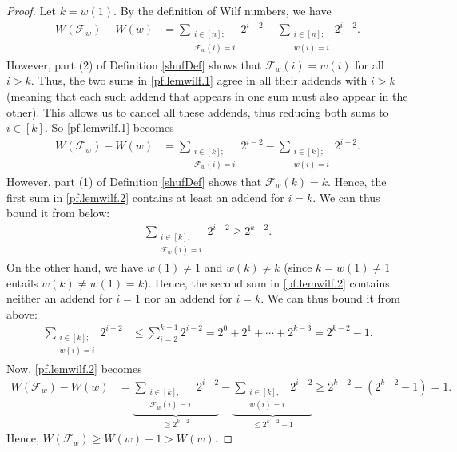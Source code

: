 \documentclass[final,nomarks]{dmtcs-episciences}
\theoremstyle{definition}
\theoremstyle{definition}
\theoremstyle{remark}
\newcommand{\f}{\mathcal{F}} %
\newcommand{\tup}[1]{\left( #1 \right)}
\begin{document}
\begin{proof}
    Let $k = w\tup{1}$.
    By the definition of Wilf numbers, we have
        \begin{align}
        W\tup{ \f_w } - W\tup{ w }
        &= \sum_{\substack{i \in [n];\\ \f_w\tup{ i }=i}} 2^{i-2} - \sum_{\substack{i \in [n];\\ w\tup{ i }=i}} 2^{i-2} .
        \label{pf.lemwilf.1}
        \end{align}
    However, part (2) of Definition \ref{shufDef} shows that $\f_w\tup{i} = w\tup{i}$ for all $i>k$.
    Thus, the two sums in \eqref{pf.lemwilf.1} agree in all their addends with $i > k$ (meaning that each such addend that appears in one sum must also appear in the other).
    This allows us to cancel all these addends, thus reducing both sums to $i \in [k]$.
    So \eqref{pf.lemwilf.1} becomes
        \begin{align}
        W\tup{ \f_w } - W\tup{ w }
        &= \sum_{\substack{i \in [k];\\ \f_w\tup{ i }=i}} 2^{i-2} - \sum_{\substack{i \in [k];\\ w\tup{ i }=i}} 2^{i-2} .
        \label{pf.lemwilf.2}
        \end{align}
    However, part (1) of Definition \ref{shufDef} shows that $\f_w\tup{k} = k$. Hence, the first sum in \eqref{pf.lemwilf.2} contains at least an addend for $i = k$. We can thus bound it from below:
    \begin{align*}
        \sum_{\substack{i \in [k];\\ \f_w\tup{ i }=i}} 2^{i-2} \ge 2^{k-2}.
    \end{align*}
    On the other hand, we have $w\tup{1} \neq 1$ and $w\tup{k} \neq k$ (since $k = w\tup{1} \neq 1$ entails $w\tup{k} \neq w\tup{1} = k$).
    Hence, the second sum in \eqref{pf.lemwilf.2} contains neither an addend for $i = 1$ nor an addend for $i = k$.
    We can thus bound it from above:
    \begin{align*}
        \sum_{\substack{i \in [k];\\ w\tup{ i }=i}} 2^{i-2}
        &\le \sum_{i=2}^{k-1} 2^{i-2}
        = 2^0 + 2^1 + \cdots + 2^{k-3}
        = 2^{k-2} - 1.
    \end{align*}
    Now, \eqref{pf.lemwilf.2} becomes
        \begin{align*}
        W\tup{ \f_w } - W\tup{ w }
        &= \underbrace{\sum_{\substack{i \in [k];\\ \f_w\tup{ i }=i}} 2^{i-2}}_{\ge 2^{k-2}} - \underbrace{\sum_{\substack{i \in [k];\\ w\tup{ i }=i}} 2^{i-2}}_{\le 2^{k-2} - 1}
        \ge 2^{k-2} - \tup{2^{k-2} - 1} = 1.
        \end{align*}
    Hence, $W\tup{ \f_w } \geq W\tup{ w } + 1 > W\tup{w}$.
\end{proof}
\end{document}

